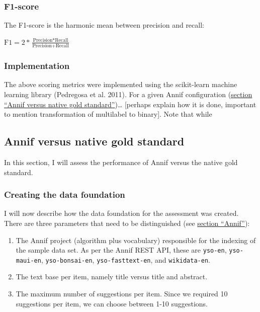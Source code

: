 \hypertarget{f1-score}{%
\subsubsection{F1-score}\label{f1-score}}

The F1-score is the harmonic mean between precision and recall:

\begin{center} 
$\text{F1} = \displaystyle 2 * \frac{\text{Precision} * \text{Recall}}{\text{Precision} + \text{Recall}}$
\end{center}

\hypertarget{implementation-1}{%
\subsubsection{Implementation}\label{implementation-1}}

The above scoring metrics were implemented using the scikit-learn
machine learning library (Pedregosa et al. 2011). For a given Annif
configuration
(\protect\hyperlink{annif-versus-native-gold-standard}{section ``Annif
versus native gold standard''})\ldots{} {[}perhaps explain how it is
done, important to mention transformation of multilabel to binary{]}.
Note that while

\hypertarget{annif-versus-native-gold-standard}{%
\subsection{Annif versus native gold
standard}\label{annif-versus-native-gold-standard}}

In this section, I will assess the performance of Annif versus the
native gold standard.

\hypertarget{creating-the-data-foundation}{%
\subsubsection{Creating the data
foundation}\label{creating-the-data-foundation}}

I will now describe how the data foundation for the assessment was
created. There are three parameters that need to be distinguished (see
\protect\hyperlink{annif}{section ``Annif''}):

\begin{enumerate}
\def\labelenumi{\arabic{enumi}.}
\tightlist
\item
  The Annif project (algorithm plus vocabulary) responsible for the
  indexing of the sample data set. As per the Annif REST API, these are
  \texttt{yso-en}, \texttt{yso-maui-en}, \texttt{yso-bonsai-en},
  \texttt{yso-fasttext-en}, and \texttt{wikidata-en}.
\item
  The text base per item, namely title versus title and abstract.
\item
  The maximum number of suggestions per item. Since we required 10
  suggestions per item, we can choose between 1-10 suggestions.
\end{enumerate}

